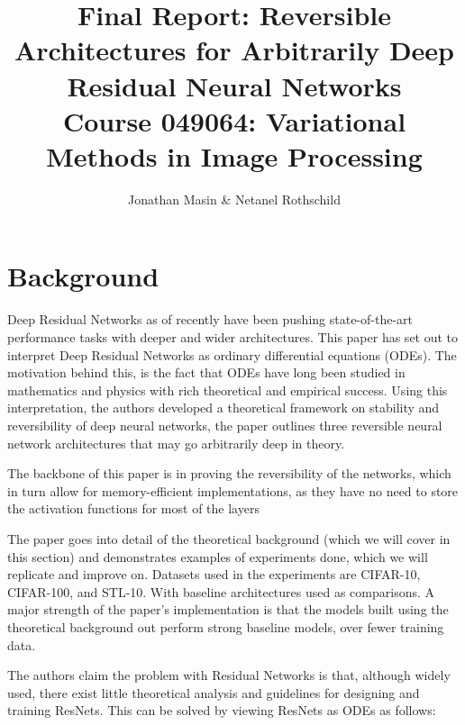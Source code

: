 \documentclass{article}
\title{Final Report: Reversible Architectures for Arbitrarily Deep Residual Neural Networks \\ \large Course 049064: Variational Methods in Image Processing}
\author{\small Jonathan Masin \& Netanel Rothschild}
\theoremstyle{remark}
\begin{document}
\date{}
\maketitle
\section*{Background}
    Deep Residual Networks as of recently have been pushing state-of-the-art performance tasks with deeper and wider architectures. This paper 
has set out to interpret Deep Residual Networks as ordinary differential equations (ODEs). The motivation behind this, is the fact that 
ODEs have long been studied in mathematics and physics with rich theoretical and empirical success. Using this interpretation, the authors 
developed a theoretical framework on stability and reversibility of deep neural networks, the paper outlines three reversible neural network 
architectures that may go arbitrarily deep in theory. \par 
    The backbone of this paper is in proving the reversibility of the networks, which in turn allow for memory-efficient implementations, 
as they have no need to store the activation functions for most of the layers \par 
    The paper goes into detail of the theoretical background (which we will cover in this section) and demonstrates examples of experiments 
done, which we will replicate and improve on. Datasets used in the experiments are CIFAR-10, CIFAR-100, and STL-10. With baseline architectures 
used as comparisons. A major strength of the paper's implementation is that the models built using the theoretical background out perform 
strong baseline models, over fewer training data. \par 
    The authors claim the problem with Residual Networks is that, although widely used, there exist little theoretical analysis and guidelines for 
designing and training ResNets. This can be solved by viewing ResNets as ODEs as follows:
\end{document}
